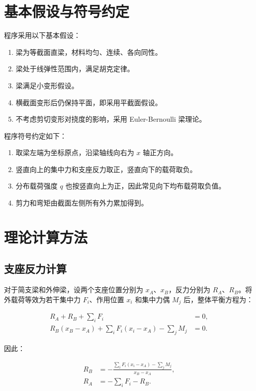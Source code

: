 \documentclass[UTF8,a4paper,12pt]{ctexart}
\numberwithin{equation}{section}
\begin{document}
\section{基本假设与符号约定}

程序采用以下基本假设：

\begin{enumerate}
    \item 梁为等截面直梁，材料均匀、连续、各向同性。
    \item 梁处于线弹性范围内，满足胡克定律。
    \item 梁满足小变形假设。
    \item 横截面变形后仍保持平面，即采用平截面假设。
    \item 不考虑剪切变形对挠度的影响，采用 Euler-Bernoulli 梁理论。
\end{enumerate}

程序符号约定如下：

\begin{enumerate}
    \item 取梁左端为坐标原点，沿梁轴线向右为 $x$ 轴正方向。
    \item 竖直向上的集中力和支座反力取正，竖直向下的载荷取负。
    \item 分布载荷强度 $q$ 也按竖直向上为正，因此常见向下均布载荷取负值。
    \item 剪力和弯矩由截面左侧所有外力累加得到。
\end{enumerate}

\section{理论计算方法}

\subsection{支座反力计算}

对于简支梁和外伸梁，设两个支座位置分别为 $x_A$、$x_B$，反力分别为 $R_A$、$R_B$。将外载荷等效为若干集中力 $F_i$、作用位置 $x_i$ 和集中力偶 $M_j$ 后，整体平衡方程为：

\begin{align}
R_A+R_B+\sum_i F_i &= 0,\\
R_B(x_B-x_A)+\sum_i F_i(x_i-x_A)-\sum_j M_j &= 0.
\end{align}

因此：

\begin{align}
R_B &= -\frac{\sum_i F_i(x_i-x_A)-\sum_j M_j}{x_B-x_A},\\
R_A &= -\sum_i F_i-R_B.
\end{align}
\end{document}
